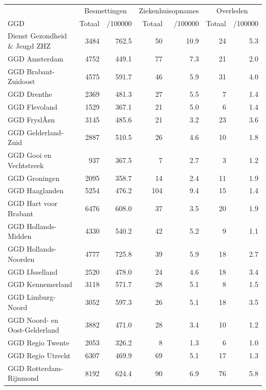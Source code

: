 \documentclass[
  english,
  man,floatsintext]{apa6}
\begin{document}
\begin{table}
\centering\begingroup\fontsize{10}{12}\selectfont

\begin{threeparttable}
\begin{tabular}{lrrrrrr}
\toprule
\multicolumn{1}{c}{ } & \multicolumn{2}{c}{Besmettingen} & \multicolumn{2}{c}{Ziekenhuisopnames} & \multicolumn{2}{c}{Overleden} \\
\cmidrule(l{3pt}r{3pt}){2-3} \cmidrule(l{3pt}r{3pt}){4-5} \cmidrule(l{3pt}r{3pt}){6-7}
GGD & Totaal & /100000 & Totaal & /100000 & Totaal & /100000\\
\midrule
Dienst Gezondheid \& Jeugd ZHZ & 3484 & 762.5 & 50 & 10.9 & 24 & 5.3\\
GGD Amsterdam & 4752 & 449.1 & 77 & 7.3 & 21 & 2.0\\
GGD Brabant-Zuidoost & 4575 & 591.7 & 46 & 5.9 & 31 & 4.0\\
GGD Drenthe & 2369 & 481.3 & 27 & 5.5 & 7 & 1.4\\
GGD Flevoland & 1529 & 367.1 & 21 & 5.0 & 6 & 1.4\\
GGD FryslÃ¢n & 3145 & 485.6 & 21 & 3.2 & 23 & 3.6\\
GGD Gelderland-Zuid & 2887 & 510.5 & 26 & 4.6 & 10 & 1.8\\
GGD Gooi en Vechtstreek & 937 & 367.5 & 7 & 2.7 & 3 & 1.2\\
GGD Groningen & 2095 & 358.7 & 14 & 2.4 & 11 & 1.9\\
GGD Haaglanden & 5254 & 476.2 & 104 & 9.4 & 15 & 1.4\\
GGD Hart voor Brabant & 6476 & 608.0 & 37 & 3.5 & 20 & 1.9\\
GGD Hollands-Midden & 4330 & 540.2 & 42 & 5.2 & 9 & 1.1\\
GGD Hollands-Noorden & 4777 & 725.8 & 39 & 5.9 & 18 & 2.7\\
GGD IJsselland & 2520 & 478.0 & 24 & 4.6 & 18 & 3.4\\
GGD Kennemerland & 3118 & 571.7 & 28 & 5.1 & 8 & 1.5\\
GGD Limburg-Noord & 3052 & 597.3 & 26 & 5.1 & 18 & 3.5\\
GGD Noord- en Oost-Gelderland & 3882 & 471.0 & 28 & 3.4 & 10 & 1.2\\
GGD Regio Twente & 2053 & 326.2 & 8 & 1.3 & 6 & 1.0\\
GGD Regio Utrecht & 6307 & 469.9 & 69 & 5.1 & 17 & 1.3\\
GGD Rotterdam-Rijnmond & 8192 & 624.4 & 90 & 6.9 & 76 & 5.8\\

\end{tabular}
\end{threeparttable}
\end{table}
\end{document}
